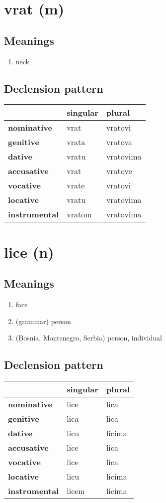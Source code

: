 \filbreak
\section{vrat (m)}
\subsection*{Meanings}
\begin{enumerate}
\item neck
\end{enumerate}
\subsection*{Declension pattern}
\begin{tabularx}{\linewidth}{Xll}
\toprule
{} & singular &     plural \\
\midrule
\textbf{nominative  } &     vrat &    vratovi \\
\textbf{genitive    } &    vrata &    vratova \\
\textbf{dative      } &    vratu &  vratovima \\
\textbf{accusative  } &     vrat &    vratove \\
\textbf{vocative    } &    vrate &    vratovi \\
\textbf{locative    } &    vratu &  vratovima \\
\textbf{instrumental} &   vratom &  vratovima \\
\bottomrule
\end{tabularx}

\filbreak
\section{lice (n)}
\subsection*{Meanings}
\begin{enumerate}
\item face
\item (grammar) person
\item (Bosnia, Montenegro, Serbia) person, individual
\end{enumerate}
\subsection*{Declension pattern}
\begin{tabularx}{\linewidth}{Xll}
\toprule
{} & singular &  plural \\
\midrule
\textbf{nominative  } &     lice &    lica \\
\textbf{genitive    } &     lica &    lica \\
\textbf{dative      } &     licu &  licima \\
\textbf{accusative  } &     lice &    lica \\
\textbf{vocative    } &     lice &    lica \\
\textbf{locative    } &     licu &  licima \\
\textbf{instrumental} &    licem &  licima \\
\bottomrule
\end{tabularx}

